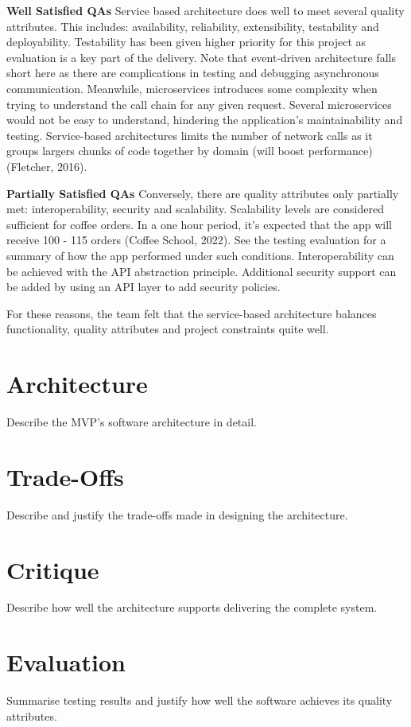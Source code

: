 \documentclass{article}
\begin{document}
\medskip \noindent \textbf{Well Satisfied QAs}
\hfill \break Service based architecture does well to meet several quality attributes. This includes: availability, reliability, extensibility, testability and deployability. Testability has been given higher priority for this project as evaluation is a key part of the delivery. Note that event-driven architecture falls short here as there are complications in testing and debugging asynchronous communication. Meanwhile, microservices introduces some complexity when trying to understand the call chain for any given request. Several microservices would not be easy to understand, hindering the application's maintainability and testing. Service-based architectures limits the number of network calls as it groups largers chunks of code together by domain (will boost performance) (Fletcher, 2016).

\medskip \noindent \textbf{Partially Satisfied QAs}
\hfill \break Conversely, there are quality attributes only partially met: interoperability, security and scalability. Scalability levels are considered sufficient for coffee orders. In a one hour period, it's expected that the app will receive 100 - 115 orders (Coffee School, 2022). See the testing evaluation for a summary of how the app performed under such conditions. Interoperability can be achieved with the API abstraction principle. Additional security support can be added by using an API layer to add security policies.

\hfill \break For these reasons, the team felt that the service-based architecture balances functionality, quality attributes and project constraints quite well.  

\section{Architecture}
Describe the MVP’s software architecture in detail.
\section{Trade-Offs}
Describe and justify the trade-offs made in designing the architecture.
\section{Critique}
Describe how well the architecture supports delivering the complete system.
\section{Evaluation}
Summarise testing results and justify how well the software achieves its quality attributes.
\end{document}
